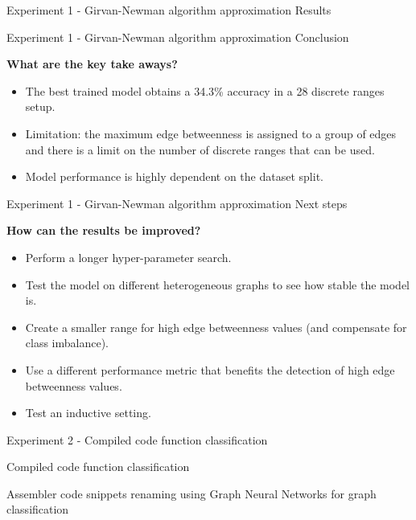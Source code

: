 \documentclass[xcolor=table]{beamer}
\begin{document}
\begin{frame}{Experiment 1 - Girvan-Newman algorithm approximation }{ Results}
\end{frame}




\begin{frame}{Experiment 1 - Girvan-Newman algorithm approximation }{ Conclusion}


\textbf{What are the key take aways?}
\begin{itemize}
    \item The best trained model obtains a 34.3\% accuracy in a 28 discrete ranges setup.
    \item Limitation: the maximum edge betweenness is assigned to a group of edges and there is a limit on the number of discrete ranges that can be used.
    \item Model performance is highly dependent on the dataset split.
\end{itemize}

\end{frame}

\begin{frame}{Experiment 1 - Girvan-Newman algorithm approximation }{ Next steps}



\textbf{How can the results be improved?}
\begin{itemize}
    \item Perform a longer hyper-parameter search.
    \item Test the model on different heterogeneous graphs to see how stable the model is.
    \item Create a smaller range for high edge betweenness values (and compensate for class imbalance).
    \item Use a different performance metric that benefits the detection of high edge betweenness values.
    \item Test an inductive setting.
\end{itemize}
\end{frame}






\begin{frame}{Experiment 2 - Compiled code function classification}{}


\begin{block}
    {
    Compiled code function classification
     }
    {
        Assembler code snippets renaming using Graph Neural Networks for graph classification

    }
\end{block}


\end{frame}
\end{document}
